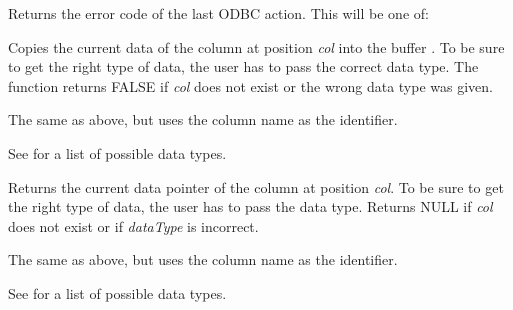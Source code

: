 

Returns the error code of the last ODBC action. This will be one of:

\begin{twocollist}\itemsep=0pt
\end{twocollist}

\label{wxrecordsetgetfielddata}


Copies the current data of the column at position {\it col} into the buffer
. To be sure to get the right type of data, the user has to pass the
correct data type. The function returns FALSE if {\it col} does not
exist or the wrong data type was given.


The same as above, but uses the column name as the identifier.

See  for a list
of possible data types.

\label{wxrecordsetgetfielddataptr}


Returns the current data pointer of the column at position {\it col}.
To be sure to get the right type of data, the user has to pass the
data type. Returns NULL if {\it col} does not exist or if {\it dataType} is
incorrect.


The same as above, but uses the column name as the identifier.

See  for a list
of possible data types.

